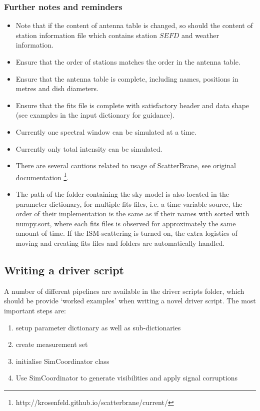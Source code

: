 \subsubsection{Further notes and reminders}
\begin{itemize}
 \item Note that if the content of antenna table is changed, so should the content of station information file which contains station $SEFD$ and weather information. 
 \item Ensure that the order of stations matches the order in the antenna table.
 \item Ensure that the antenna table is complete, including names, positions in metres and dish diameters.
 \item Ensure that the {\sc fits} file is complete with satisfactory header and data shape (see examples in the input dictionary for guidance).
 \item Currently one spectral window can be simulated at a time.
 \item Currently only total intensity can be simulated.
 \item There are several cautions related to usage of ScatterBrane, see original documentation \footnote{http://krosenfeld.github.io/scatterbrane/current/}. 
 \item The path of the folder containing the sky model is also located in the parameter dictionary, for multiple fits files, i.e. a time-variable source, the order of their implementation is the same as if their names with sorted with numpy.sort, where each fits files is observed for approximately the same amount of time. If the ISM-scattering is turned on, the extra logistics of moving and creating fits files and folders are automatically handled. 
\end{itemize}

\subsection{Writing a driver script}
 
A number of different pipelines are available in the driver scripts folder, which should be provide `worked examples' when writing a novel driver script. The most important steps are:
\begin{enumerate}
 \item setup parameter dictionary as well as sub-dictionaries
 \item create measurement set
 \item initialise SimCoordinator class
 \item Use SimCoordinator to generate visibilities and apply signal corruptions
\end{enumerate}

